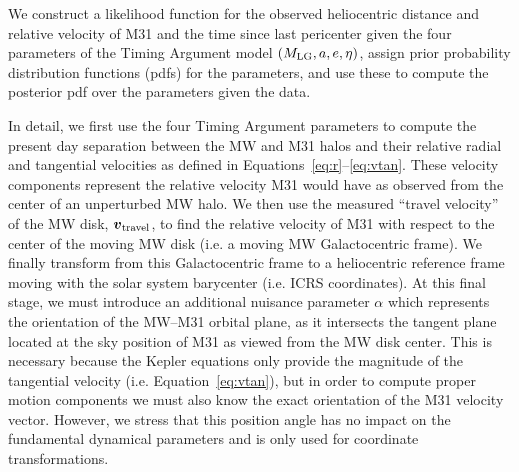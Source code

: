 \documentclass[twocolumn]{aastex631}
\newcommand{\mlg}{\ensuremath{M_{\rm LG}}}
\newcommand{\bov}{\ensuremath{\boldsymbol{v}}}
\newcommand{\vtrav}{\ensuremath{\bov_{\rm travel}}}
\begin{document}
We construct a likelihood function for the observed heliocentric distance and
relative velocity of M31 and the time since last pericenter given the four parameters of
the Timing Argument model $(\mlg, a, e, \eta)$, assign prior probability
distribution functions (pdfs) for the parameters, and use these to compute the
posterior pdf over the parameters given the data.

In detail, we first use the four Timing Argument parameters to compute the
present day separation between the MW and M31 halos and their relative radial and
tangential velocities as defined in Equations~\ref{eq:r}--\ref{eq:vtan}.
These velocity components represent the relative velocity M31 would have as
observed from the center of an unperturbed MW halo.
We then use the measured ``travel velocity'' of the MW disk,
$\vtrav$, to find the relative velocity of M31 with respect to the center of the moving MW disk (i.e. a moving MW Galactocentric frame).
We finally transform from this Galactocentric frame to a heliocentric
reference frame moving with the solar system barycenter (i.e. ICRS coordinates).
At this final stage, we must introduce an additional nuisance parameter $\alpha$
which represents the orientation of the MW--M31 orbital plane, as it intersects
the tangent plane located at the sky position of M31 as viewed from the MW disk
center.
This is necessary because the Kepler equations only provide the magnitude of the
tangential velocity (i.e. Equation~\ref{eq:vtan}), but in order to compute
proper motion components we must also know the exact orientation of the M31
velocity vector.
However, we stress that this position angle has no impact on the fundamental
dynamical parameters and is only used for coordinate transformations.
\end{document}
